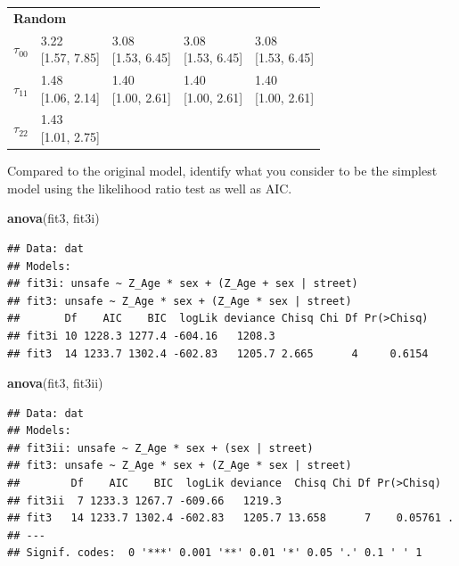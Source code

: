 \documentclass[]{article}
\newenvironment{Shaded}{\begin{snugshade}}{\end{snugshade}}
\newcommand{\KeywordTok}[1]{\textcolor[rgb]{0.13,0.29,0.53}{\textbf{#1}}}
\newcommand{\NormalTok}[1]{#1}
\begin{document}
\begin{table}[H]
\begin{tabular}{lllll}
\multicolumn{5}{l}{\textbf{Random}}\\
\hspace{1em}$\tau_{00}$ & \makecell{3.22 \\ {[1.57, 7.85]}} & \makecell{3.08 \\ {[1.53, 6.45]}} & \makecell{3.08 \\ {[1.53, 6.45]}} & \makecell{3.08 \\ {[1.53, 6.45]}}\\
\hspace{1em}$\tau_{11}$ & \makecell{1.48 \\ {[1.06, 2.14]}} & \makecell{1.40 \\ {[1.00, 2.61]}} & \makecell{1.40 \\ {[1.00, 2.61]}} & \makecell{1.40 \\ {[1.00, 2.61]}}\\
\hspace{1em}$\tau_{22}$ & \makecell{1.43 \\ {[1.01, 2.75]}} &  &  & \\
\bottomrule
\end{tabular}
\end{table}

Compared to the original model, identify what you consider to be the
simplest model using the likelihood ratio test as well as AIC.

\begin{Shaded}
\begin{Highlighting}[]
\KeywordTok{anova}\NormalTok{(fit3, fit3i)}
\end{Highlighting}
\end{Shaded}

\begin{verbatim}
## Data: dat
## Models:
## fit3i: unsafe ~ Z_Age * sex + (Z_Age + sex | street)
## fit3: unsafe ~ Z_Age * sex + (Z_Age * sex | street)
##       Df    AIC    BIC  logLik deviance Chisq Chi Df Pr(>Chisq)
## fit3i 10 1228.3 1277.4 -604.16   1208.3                        
## fit3  14 1233.7 1302.4 -602.83   1205.7 2.665      4     0.6154
\end{verbatim}

\begin{Shaded}
\begin{Highlighting}[]
\KeywordTok{anova}\NormalTok{(fit3, fit3ii)}
\end{Highlighting}
\end{Shaded}

\begin{verbatim}
## Data: dat
## Models:
## fit3ii: unsafe ~ Z_Age * sex + (sex | street)
## fit3: unsafe ~ Z_Age * sex + (Z_Age * sex | street)
##        Df    AIC    BIC  logLik deviance  Chisq Chi Df Pr(>Chisq)  
## fit3ii  7 1233.3 1267.7 -609.66   1219.3                           
## fit3   14 1233.7 1302.4 -602.83   1205.7 13.658      7    0.05761 .
## ---
## Signif. codes:  0 '***' 0.001 '**' 0.01 '*' 0.05 '.' 0.1 ' ' 1
\end{verbatim}
\end{document}
